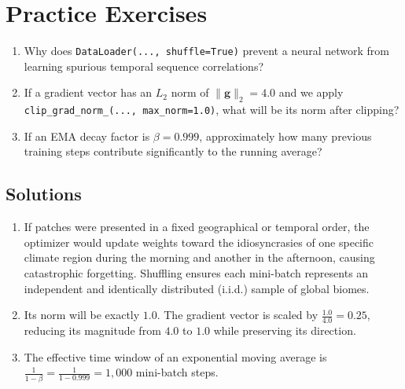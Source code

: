 \section{Practice Exercises}
\begin{enumerate}
    \item Why does \texttt{DataLoader(..., shuffle=True)} prevent a neural network from learning spurious temporal sequence correlations?
    \item If a gradient vector has an $L_2$ norm of $\|\mathbf{g}\|_2 = 4.0$ and we apply \texttt{clip\_grad\_norm\_(..., max\_norm=1.0)}, what will be its norm after clipping?
    \item If an EMA decay factor is $\beta = 0.999$, approximately how many previous training steps contribute significantly to the running average?
\end{enumerate}

\subsection*{Solutions}
\begin{enumerate}
    \item If patches were presented in a fixed geographical or temporal order, the optimizer would update weights toward the idiosyncrasies of one specific climate region during the morning and another in the afternoon, causing catastrophic forgetting. Shuffling ensures each mini-batch represents an independent and identically distributed (i.i.d.) sample of global biomes.
    \item Its norm will be exactly $1.0$. The gradient vector is scaled by $\frac{1.0}{4.0} = 0.25$, reducing its magnitude from $4.0$ to $1.0$ while preserving its direction.
    \item The effective time window of an exponential moving average is $\frac{1}{1 - \beta} = \frac{1}{1 - 0.999} = 1{,}000$ mini-batch steps.
\end{enumerate}
